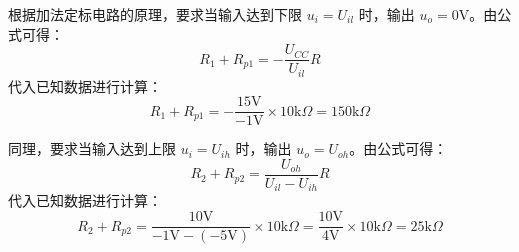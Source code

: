 \documentclass[10.5pt]{config}
\begin{document}
\begin{enumerate}[label=\arabic*., leftmargin=2em]
根据加法定标电路的原理，要求当输入达到下限 $u_i = U_{il}$ 时，输出 $u_o = 0\mathrm{V}$。由公式可得：
\begin{equation*}
    R_1 + R_{p1} = -\frac{U_{CC}}{U_{il}} R
\end{equation*}
代入已知数据进行计算：
\begin{equation*}
    R_1 + R_{p1} = -\frac{15\mathrm{V}}{-1\mathrm{V}} \times 10\mathrm{k}\Omega = 150\mathrm{k}\Omega
\end{equation*}

同理，要求当输入达到上限 $u_i = U_{ih}$ 时，输出 $u_o = U_{oh}$。由公式可得：
\begin{equation*}
    R_2 + R_{p2} = \frac{U_{oh}}{U_{il} - U_{ih}} R
\end{equation*}
代入已知数据进行计算：
\begin{equation*}
    R_2 + R_{p2} = \frac{10\mathrm{V}}{-1\mathrm{V} - (-5\mathrm{V})} \times 10\mathrm{k}\Omega = \frac{10\mathrm{V}}{4\mathrm{V}} \times 10\mathrm{k}\Omega = 25\mathrm{k}\Omega
\end{equation*}



\end{enumerate}
\end{document}
